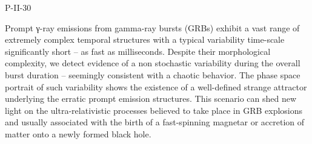 P-II-30


\bigskip



\bigskip

\noindent Prompt γ-ray emissions from gamma-ray bursts (GRBs) exhibit a vast range of extremely complex temporal structures with a typical variability time-scale significantly short – as fast as milliseconds. Despite their morphological complexity, we detect evidence of a non stochastic  variability during the overall burst duration – seemingly consistent with a chaotic behavior. The phase space portrait of such variability shows the existence of a well-defined strange attractor underlying the erratic prompt emission structures. This scenario can shed new light on the ultra-relativistic processes believed to take place in GRB explosions and usually associated with the birth of a fast-spinning magnetar or accretion of matter onto a newly formed black hole.

